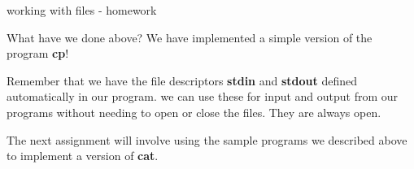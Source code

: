 \documentclass[10pt]{beamer}
\begin{document}
\begin{frame}[fragile]{working with files - homework}

What have we done above?  We have implemented a simple version of the program \textbf{cp}!

Remember that we have the file descriptors \textbf{stdin} and \textbf{stdout} defined automatically in our program.  we can use these for input and output from our programs without needing to open or close the files.  They are always open.  

The next assignment will involve using the sample programs we described above to implement a version of \textbf{cat}.

\end{frame}
\end{document}
